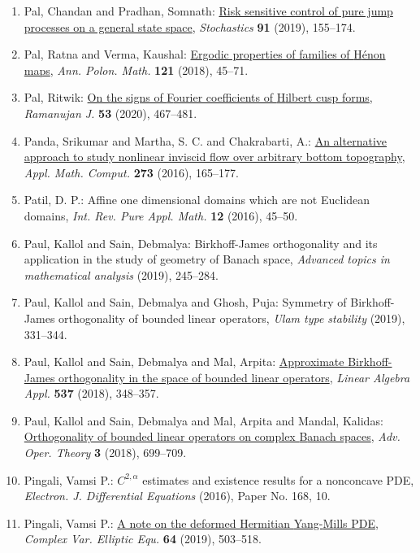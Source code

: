 \begin{enumerate}
\item Pal, Chandan and Pradhan, Somnath: \href{https://doi.org/10.1080/17442508.2018.1521413}{Risk sensitive control of pure jump processes on a general
state space}, \emph{Stochastics} {\bf 91} (2019), 155--174.
\item Pal, Ratna and Verma, Kaushal: \href{https://doi.org/10.4064/ap170928-2-4}{Ergodic properties of families of {H}\'{e}non maps}, \emph{Ann. Polon. Math.} {\bf 121} (2018), 45--71.
\item Pal, Ritwik: \href{https://doi.org/10.1007/s11139-019-00206-4}{On the signs of {F}ourier coefficients of {H}ilbert cusp
forms}, \emph{Ramanujan J.} {\bf 53} (2020), 467--481.
\item Panda, Srikumar and Martha, S. C. and Chakrabarti, A.: \href{https://doi.org/10.1016/j.amc.2015.09.086}{An alternative approach to study nonlinear inviscid flow over
arbitrary bottom topography}, \emph{Appl. Math. Comput.} {\bf 273} (2016), 165--177.
\item Patil, D. P.: Affine one dimensional domains which are not {E}uclidean
domains, \emph{Int. Rev. Pure Appl. Math.} {\bf 12} (2016), 45--50.
\item Paul, Kallol and Sain, Debmalya: Birkhoff-{J}ames orthogonality and its application in the
study of geometry of {B}anach space, \emph{Advanced topics in mathematical analysis} {\bf } (2019), 245--284.
\item Paul, Kallol and Sain, Debmalya and Ghosh, Puja: Symmetry of {B}irkhoff-{J}ames orthogonality of bounded linear
operators, \emph{Ulam type stability} {\bf } (2019), 331--344.
\item Paul, Kallol and Sain, Debmalya and Mal, Arpita: \href{https://doi.org/10.1016/j.laa.2017.10.008}{Approximate {B}irkhoff-{J}ames orthogonality in the space of
bounded linear operators}, \emph{Linear Algebra Appl.} {\bf 537} (2018), 348--357.
\item Paul, Kallol and Sain, Debmalya and Mal, Arpita and Mandal,
Kalidas: \href{https://doi.org/10.15352/aot.1712-1268}{Orthogonality of bounded linear operators on complex {B}anach
spaces}, \emph{Adv. Oper. Theory} {\bf 3} (2018), 699--709.
\item Pingali, Vamsi P.: {$C^{2,\alpha}$} estimates and existence results for a
nonconcave {PDE}, \emph{Electron. J. Differential Equations} {\bf } (2016), Paper No. 168, 10.
\item Pingali, Vamsi P.: \href{https://doi.org/10.1080/17476933.2018.1454914}{A note on the deformed {H}ermitian {Y}ang-{M}ills {PDE}}, \emph{Complex Var. Elliptic Equ.} {\bf 64} (2019), 503--518.

\end{enumerate}

